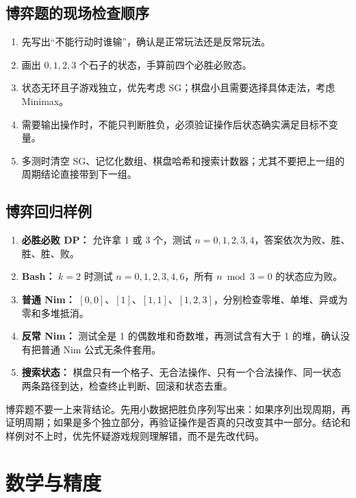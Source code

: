 \documentclass[UTF8,openany,oneside,zihao=-4]{ctexbook}
\begin{document}
\section{博弈题的现场检查顺序}

\begin{enumerate}
  \item 先写出“不能行动时谁输”，确认是正常玩法还是反常玩法。
  \item 画出 $0,1,2,3$ 个石子的状态，手算前四个必胜必败态。
  \item 状态无环且子游戏独立，优先考虑 SG；棋盘小且需要选择具体走法，考虑 Minimax。
  \item 需要输出操作时，不能只判断胜负，必须验证操作后状态确实满足目标不变量。
  \item 多测时清空 SG、记忆化数组、棋盘哈希和搜索计数器；尤其不要把上一组的周期结论直接带到下一组。
\end{enumerate}

\section{博弈回归样例}

\begin{enumerate}
  \item \textbf{必胜必败 DP：} 允许拿 1 或 3 个，测试 $n=0,1,2,3,4$，答案依次为败、胜、胜、胜、败。
  \item \textbf{Bash：} $k=2$ 时测试 $n=0,1,2,3,4,6$，所有 $n\bmod3=0$ 的状态应为败。
  \item \textbf{普通 Nim：} $[0,0]$、$[1]$、$[1,1]$、$[1,2,3]$，分别检查零堆、单堆、异或为零和多堆抵消。
  \item \textbf{反常 Nim：} 测试全是 1 的偶数堆和奇数堆，再测试含有大于 1 的堆，确认没有把普通 Nim 公式无条件套用。
  \item \textbf{搜索状态：} 棋盘只有一个格子、无合法操作、只有一个合法操作、同一状态两条路径到达，检查终止判断、回滚和状态去重。
\end{enumerate}

\begin{tip}
 博弈题不要一上来背结论。先用小数据把胜负序列写出来：如果序列出现周期，再证明周期；如果是多个独立部分，再验证操作是否真的只改变其中一部分。结论和样例对不上时，优先怀疑游戏规则理解错，而不是先改代码。
\end{tip}

\chapter{数学与精度}
\end{document}
